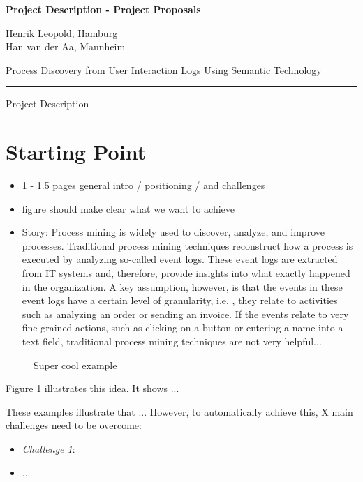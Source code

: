 \documentclass{scrartcl}
\newcommand{\applicants}{\normalfont  Henrik Leopold, Hamburg \\ Han van der Aa, Mannheim \bfseries}
\newcommand{\project}{Process Discovery from User Interaction Logs Using Semantic Technology}
\begin{document}

{\raggedright{} \normalsize \bfseries 
	Project Description - Project Proposals \par 
	\applicants{} \par
	\project{} \par
	\rule{\textwidth}{0.5pt} \par
	Project Description
}

\newenvironment{nscenter}
 {\parskip=3pt\par\nopagebreak\centering}
 {\par\noindent\ignorespacesafterend}

\section{Starting Point}

\begin{itemize}
\item 1 - 1.5 pages general intro / positioning / and challenges
\item figure should make clear what we want to achieve
\item Story: Process mining is widely used to discover, analyze, and improve processes. Traditional process mining techniques reconstruct how a process is executed by analyzing so-called event logs. These event logs are extracted from IT systems and, therefore, provide insights into what exactly happened in the organization. A key assumption, however, is that the events in these event logs have a certain level of granularity, i.e. , they relate to activities such as analyzing an order or sending an invoice. If the events relate to very fine-grained actions, such as clicking on a button or entering a name into a text field, traditional process mining techniques are not very helpful... 
\end{itemize}


\begin{figure}[h!]
\centering
\caption{Super cool example}
\label{fig:example}
\end{figure}

Figure \ref{fig:example} illustrates this idea. It shows ... 

These examples illustrate that ...  However, to automatically achieve this, X main challenges need to be overcome: 

\begin{itemize}
\item \textit{Challenge 1}: 
\item ...
\end{itemize}
\end{document}
